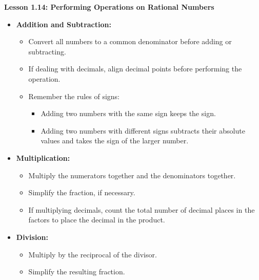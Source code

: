 \begin{center}
\textbf{Lesson 1.14: Performing Operations on Rational Numbers}
\end{center}

\vspace*{-1.5ex}

\begin{itemize}
    \item \textbf{Addition and Subtraction:}
    \begin{itemize}
        \item Convert all numbers to a common denominator before adding or subtracting.
        \item If dealing with decimals, align decimal points before performing the operation.
        \item Remember the rules of signs: 
        \begin{itemize}
            \item Adding two numbers with the same sign keeps the sign.
            \item Adding two numbers with different signs subtracts their absolute values and takes the sign of the larger number.
        \end{itemize}
    \end{itemize}
    \item \textbf{Multiplication:}
    \begin{itemize}
        \item Multiply the numerators together and the denominators together.
        \item Simplify the fraction, if necessary.
        \item If multiplying decimals, count the total number of decimal places in the factors to place the decimal in the product.
    \end{itemize}
    \item \textbf{Division:}
    \begin{itemize}
        \item Multiply by the reciprocal of the divisor.
        \item Simplify the resulting fraction.
    \end{itemize}
\end{itemize}
